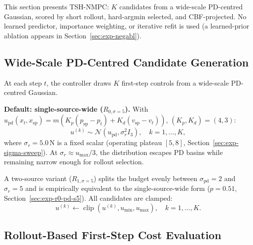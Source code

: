 \documentclass[11pt,onecolumn,a4paper]{article}
\newcommand{\spt}{\mathrm{sp}}
\newcommand{\pd}{\mathrm{pd}}
\begin{document}
This section presents TSH-NMPC: $K$ candidates from a wide-scale
PD-centred Gaussian, scored by short rollout, hard-argmin selected,
and CBF-projected. No learned predictor, importance weighting, or
iterative refit is used (a learned-prior ablation appears in
Section~\ref{sec:exp-negabl}).

\subsection{Wide-Scale PD-Centred Candidate Generation}

At each step $t$, the controller draws $K$ first-step controls from a
wide-scale PD-centred Gaussian.

\textbf{Default: single-source-wide ($R_{0,\sigma=5}$).} With
$u_\pd(x_t, x_\spt) = m (K_p (p_\spt - p_t) + K_d (v_\spt - v_t))$,
$(K_p, K_d) = (4, 3)$:
\begin{equation}\label{eq:srcA}
u^{(k)} \sim \mathcal{N}(u_\pd, \sigma_r^2 I_3),\quad k = 1, \ldots, K,
\end{equation}
where $\sigma_r = 5.0\,\mathrm{N}$ is a fixed scalar (operating plateau
$[5, 8]$, Section~\ref{sec:exp-sigma-sweep}). At
$\sigma_r \approx u_{\max}/3$, the distribution escapes PD basins
while remaining narrow enough for rollout selection.

A two-source variant ($R_{1,\sigma=5}$) splits the budget evenly
between $\sigma_\pd = 2$ and $\sigma_r = 5$ and is empirically
equivalent to the single-source-wide form ($p = 0.51$,
Section~\ref{sec:exp-r0-pd-s5}).
All candidates are clamped:
\begin{equation}\label{eq:clip}
u^{(k)} \leftarrow \operatorname{clip}(u^{(k)}, u_{\min}, u_{\max}),
\quad k = 1, \ldots, K.
\end{equation}

\subsection{Rollout-Based First-Step Cost Evaluation}
\end{document}
